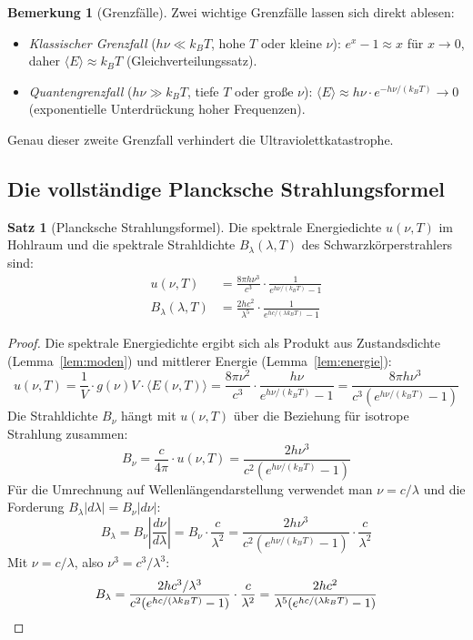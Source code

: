 ﻿\documentclass[a4paper,12pt]{article}
\theoremstyle{definition}
\newtheorem{satz}{Satz}
\newtheorem{bemerkung}{Bemerkung}
\begin{document}
\begin{bemerkung}[Grenzfälle]
    Zwei wichtige Grenzfälle lassen sich direkt ablesen:
    \begin{itemize}
        \item \emph{Klassischer Grenzfall} ($h\nu \ll k_B T$, hohe $T$ oder kleine $\nu$):
              $e^x - 1 \approx x$ für $x \to 0$, daher
              $\langle E \rangle \approx k_B T$ (Gleichverteilungssatz).
        \item \emph{Quantengrenzfall} ($h\nu \gg k_B T$, tiefe $T$ oder große $\nu$):
              $\langle E \rangle \approx h\nu \cdot e^{-h\nu/(k_BT)} \to 0$
              (exponentielle Unterdrückung hoher Frequenzen).
    \end{itemize}
    Genau dieser zweite Grenzfall verhindert die Ultraviolettkatastrophe.
\end{bemerkung}

\subsection{Die vollständige Plancksche Strahlungsformel}

\begin{satz}[Plancksche Strahlungsformel]
\label{satz:planck}
    Die spektrale Energiedichte $u(\nu, T)$ im Hohlraum und die spektrale
    Strahldichte $B_\lambda(\lambda, T)$ des Schwarzkörperstrahlers sind:
    \begin{align}
        u(\nu, T) &= \frac{8\pi h \nu^3}{c^3} \cdot \frac{1}{e^{h\nu/(k_B T)} - 1}
        \label{eq:planck_nu} \\[6pt]
        B_\lambda(\lambda, T) &= \frac{2hc^2}{\lambda^5} \cdot
        \frac{1}{e^{hc/(\lambda k_B T)} - 1}
        \label{eq:planck_lam}
    \end{align}
\end{satz}

\begin{proof}
    Die spektrale Energiedichte ergibt sich als Produkt aus Zustandsdichte
    (Lemma~\ref{lem:moden}) und mittlerer Energie (Lemma~\ref{lem:energie}):
    \[
        u(\nu, T) = \frac{1}{V} \cdot g(\nu) V \cdot \langle E(\nu,T) \rangle
        = \frac{8\pi\nu^2}{c^3} \cdot \frac{h\nu}{e^{h\nu/(k_BT)}-1}
        = \frac{8\pi h\nu^3}{c^3(e^{h\nu/(k_BT)}-1)}
    \]
    Die Strahldichte $B_\nu$ hängt mit $u(\nu,T)$ über die Beziehung
    für isotrope Strahlung zusammen:
    \[
        B_\nu = \frac{c}{4\pi} \cdot u(\nu, T)
        = \frac{2h\nu^3}{c^2(e^{h\nu/(k_BT)}-1)}
    \]
    Für die Umrechnung auf Wellenlängendarstellung verwendet man
    $\nu = c/\lambda$ und die Forderung $B_\lambda |d\lambda| = B_\nu |d\nu|$:
    \[
        B_\lambda = B_\nu \left|\frac{d\nu}{d\lambda}\right|
        = B_\nu \cdot \frac{c}{\lambda^2}
        = \frac{2h\nu^3}{c^2(e^{h\nu/(k_BT)}-1)} \cdot \frac{c}{\lambda^2}
    \]
    Mit $\nu = c/\lambda$, also $\nu^3 = c^3/\lambda^3$:
    \[
        B_\lambda = \frac{2h c^3/\lambda^3}{c^2(e^{hc/(\lambda k_BT)}-1)}
        \cdot \frac{c}{\lambda^2}
        = \frac{2hc^2}{\lambda^5(e^{hc/(\lambda k_BT)}-1)} \qedhere
    \]
\end{proof}
\end{document}
